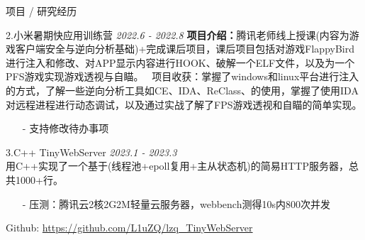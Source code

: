 \documentclass{resume} %
\begin{document}
\begin{rSection}{项目 / 研究经历}
\begin{rSubsection}{2.小米暑期快应用训练营} {\em 2022.6 - 2022.8}
{\noindent \textbf{项目介绍：}腾讯老师线上授课(内容为游戏客户端安全与逆向分析基础)+完成课后项目，课后项目包括对游戏FlappyBird进行注入和修改、对APP显示内容进行HOOK、破解一个ELF文件，以及为一个PFS游戏实现游戏透视与自瞄。} \
{项目收获：掌握了windows和linux平台进行注入的方式，了解一些逆向分析工具如CE、IDA、ReClass、的使用，掌握了使用IDA对远程进程进行动态调试，以及通过实战了解了FPS游戏透视和自瞄的简单实现。} 
{}
\item[]
\begin{itemize}
\setlength\itemsep{-0.5em}
\item[]
\item[-] 支持修改待办事项
\end{itemize}
\end{rSubsection}


\begin{rSubsection}{3.C++ TinyWebServer} {\em 2023.1 - 2023.3}
{\\}
{用C++实现了一个基于(线程池+epoll复用+主从状态机)的简易HTTP服务器，总共1000+行。}
\item[]
\begin{itemize}
\setlength\itemsep{-0.5em}
\item[-] 压测：腾讯云2核2G2M轻量云服务器，webbench测得10s内800次并发
\end{itemize}
{Github: \rm \url{https://github.com/L1uZQ/lzq_TinyWebServer}}
\end{rSubsection}


\end{rSection}



\end{document}
